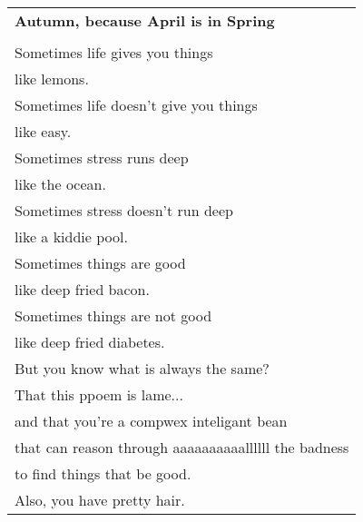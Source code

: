 \documentclass{article}
\begin{document}
\newcommand{\h}{\hspace{3ex}}
\newcommand{\hoar}{%
\begin{center}
\line(1,0){350}
\end{center}
}

\begin{center}
\begin{tabular}{l}
\textbf{Autumn, because April is in Spring} \\
\\
Sometimes life gives you things \\
\h{}like lemons. \\
Sometimes life doesn't give you things \\
\h{}like easy. \\
Sometimes stress runs deep \\
\h{}like the ocean. \\
Sometimes stress doesn't run deep \\
\h{}like a kiddie pool. \\
Sometimes things are good \\
\h{}like deep fried bacon. \\
Sometimes things are not good \\
\h{}like deep fried diabetes. \\
But you know what is always the same? \\
\h{}That this ppoem is lame... \\
\h{}and that you're a compwex inteligant bean \\
\h{}that can reason through aaaaaaaaaallllll the badness \\
\h{}to find things that be good. \\
Also, you have pretty hair. \\
\end{tabular}
\end{center}
\end{document}
